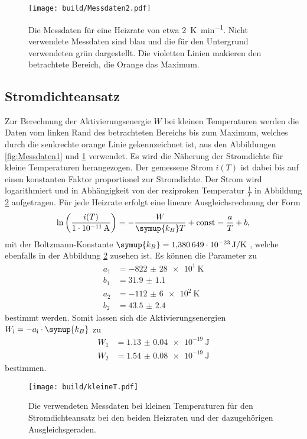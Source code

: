 \begin{figure}[htb]
  \centering
  \texttt{[image: build/Messdaten2.pdf]}
  \caption{Die Messdaten für eine Heizrate von etwa \SI{2}{\kelvin\per\minute}. Nicht verwendete Messdaten sind blau und die für den Untergrund verwendeten grün dargestellt. Die violetten Linien makieren den betrachtete Bereich, die Orange das Maximum.}
  \label{fig:Messdaten2}
\end{figure}
\FloatBarrier

\subsection{Stromdichteansatz}
\label{sec:klT}
Zur Berechnung der Aktivierungsenergie $W$ bei kleinen Temperaturen werden die Daten vom linken Rand des betrachteten Bereichs bis zum Maximum, welches durch die senkrechte orange Linie gekennzeichnet ist,
aus den Abbildungen \ref{fig:Messdaten1} und \ref{fig:Messdaten2} verwendet. Es wird die Näherung der Stromdichte für kleine Temperaturen
herangezogen. Der gemessene Strom $i(T)$ ist dabei bis auf einen konstanten Faktor proportionel zur Stromdichte. Der Strom wird logarithmiert
und in Abhängigkeit von der reziproken Temperatur $\frac{1}{T}$ in Abbildung \ref{fig:klT} aufgetragen. Für jede Heizrate erfolgt eine lineare Ausgleichsrechnung der Form
\begin{equation}
    \label{eqn:lin}
    \ln\left(\frac{i(T)}{\SI{1e-11}{\ampere}}\right) = -\frac{W}{\symup{k_B} T} + \text{const} = \frac{a}{T} + b,
\end{equation}
mit der Boltzmann-Konstante $\symup{k_B} = \SI{1.380649e-23}{\joule\per\kelvin}$ \cite{codata}, welche ebenfalls in der Abbildung \ref{fig:klT} zusehen ist.
Es können die Parameter zu
\begin{align*}
    a_1 &= \SI{-822(28)e1}{\kelvin} \\
    b_1 &= \num{31.9(11)} \\
    a_2 &= \SI{-112(6)e2}{\kelvin} \\
    b_2 &= \num{43.5(24)}
\end{align*}
bestimmt werden.
Somit lassen sich die Aktivierungsenergien $W_\text{i} = -a_\text{i} \cdot \symup{k_B}$ zu
\begin{align*}
    W_1 &= \SI{1.13(4)e-19}{\joule} \\
    W_2 &= \SI{1.54(8)e-19}{\joule}
\end{align*}
bestimmen.
\begin{figure}[htb]
  \centering
  \texttt{[image: build/kleineT.pdf]}
  \caption{Die verwendeten Messdaten bei kleinen Temperaturen für den Stromdichteansatz bei den beiden Heizraten und der dazugehörigen Ausgleichsgeraden.}
  \label{fig:klT}
\end{figure}
\FloatBarrier

